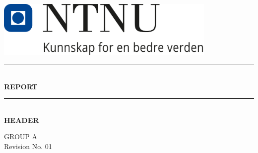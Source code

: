 \begin{titlepage}

\newcommand{\HorizontalRule}{\rule{\linewidth}{0.3mm}} %

	\begin{center}

    \includegraphics[width=0.8\textwidth]{Figures/NTNU_logo.png}
	
	
	
	\HorizontalRule \\ [0.1cm] 

	{\huge\bfseries REPORT \linespread{1.2} \\ \Large\bfseries}

	\HorizontalRule \\ [2cm]


    {\huge\bfseries HEADER}

    \vspace{4cm}
    
    {\Large GROUP A \\ Revision No. 01}


	\end{center}

\end{titlepage}